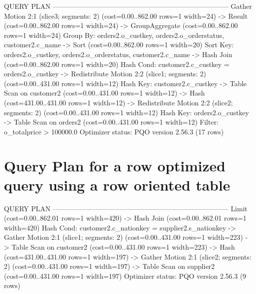 \documentclass[a4paper,11pt]{report}
\begin{document}
\begin{sqlcode}
                                                       QUERY PLAN            
-----------------------------------------------------------------------------
 Gather Motion 2:1  (slice3; segments: 2)  (cost=0.00..862.00 rows=1 width=24)
   ->  Result  (cost=0.00..862.00 rows=1 width=24)
         ->  GroupAggregate  (cost=0.00..862.00 rows=1 width=24)
               Group By: orders2.o_custkey, orders2.o_orderstatus, customer2.c_name
               ->  Sort  (cost=0.00..862.00 rows=1 width=20)
                     Sort Key: orders2.o_custkey, orders2.o_orderstatus, customer2.c_name
                     ->  Hash Join  (cost=0.00..862.00 rows=1 width=20)
                           Hash Cond: customer2.c_custkey = orders2.o_custkey
                           ->  Redistribute Motion 2:2  (slice1; segments: 2)  (cost=0.00..431.00 rows=1 width=12)
                                 Hash Key: customer2.c_custkey
                                 ->  Table Scan on customer2  (cost=0.00..431.00 rows=1 width=12)
                           ->  Hash  (cost=431.00..431.00 rows=1 width=12)
                                 ->  Redistribute Motion 2:2  (slice2; segments: 2)  (cost=0.00..431.00 rows=1 width=12)
                                       Hash Key: orders2.o_custkey
                                       ->  Table Scan on orders2  (cost=0.00..431.00 rows=1 width=12)
                                             Filter: o_totalprice > 100000.0
 Optimizer status: PQO version 2.56.3
(17 rows)
\end{sqlcode}

\chapter{Query Plan for a row optimized query using a row oriented table}
\label{ap:row-better-row}

\begin{sqlcode}
                                                       QUERY PLAN            
-----------------------------------------------------------------------------
 Limit  (cost=0.00..862.01 rows=1 width=420)
   ->  Hash Join  (cost=0.00..862.01 rows=1 width=420)
         Hash Cond: customer2.c_nationkey = supplier2.s_nationkey
         ->  Gather Motion 2:1  (slice1; segments: 2)  (cost=0.00..431.00 rows=1 width=223)
               ->  Table Scan on customer2  (cost=0.00..431.00 rows=1 width=223)
         ->  Hash  (cost=431.00..431.00 rows=1 width=197)
               ->  Gather Motion 2:1  (slice2; segments: 2)  (cost=0.00..431.00 rows=1 width=197)
                     ->  Table Scan on supplier2  (cost=0.00..431.00 rows=1 width=197)
 Optimizer status: PQO version 2.56.3
(9 rows)
\end{sqlcode}
\end{document}

